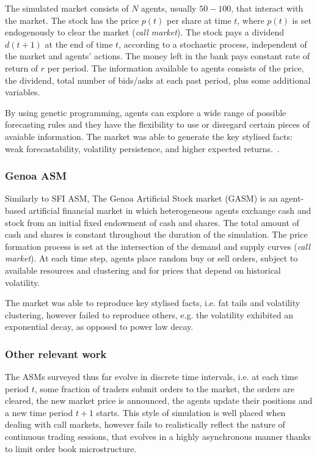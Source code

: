 The simulated market consists of $N$ agents, usually $50-100$, that interact with the market. The stock has the price $p(t)$ per share at time $t$, where $p(t)$ is set endogenously to clear the market (\textit{call market}). The stock pays a dividend $d(t+1)$ at the end of time $t$, according to a stochastic process, independent of the market and agents' actions. The money left in the bank pays constant rate of return of $r$ per period. The information available to agents consists of the price, the dividend, total number of bids/asks at each past period, plus some additional variables. 

By using genetic programming, agents can explore a wide range of possible forecasting rules and they have the flexibility to use or disregard certain pieces of avaiable information. The market was able to generate the key stylised facts: weak forecastability, volatility persistence, and higher expected returns.~\cite{Lebaron99}. 

\subsubsection{Genoa ASM~\citep{Raberto2001}}
Similarly to SFI ASM, The Genoa Artificial Stock market (GASM) is an agent-based artificial financial market in which heterogeneous agents exchange cash and stock from an initial fixed endowment of cash and shares. The total amount of cash and shares is constant throughout the duration of the simulation. The price formation process is set at the intersection of the demand and supply curves (\textit{call market}). At each time step, agents place random buy or sell orders, subject to available resources and clustering and for prices that depend on historical volatility.

The market was able to reproduce key stylised facts, i.e. fat tails and volatility clustering, however failed to reproduce others, e.g. the volatility exhibited an exponential decay, as opposed to power law decay.

\subsubsection{Other relevant work}
The ASMs surveyed thus far evolve in discrete time intervals, i.e. at each time period $t$, some fraction of traders submit orders to the market, the orders are cleared, the new market price is announced, the agents update their positions and a new time period $t+1$ starts. This style of simulation is well placed when dealing with call markets, however fails to realistically reflect the nature of continuous trading sessions, that evolves in a highly asynchronous manner thanks to limit order book microstructure.  

